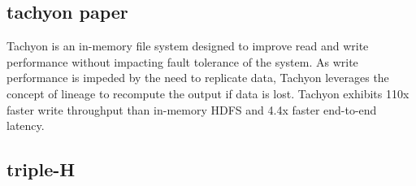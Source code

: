 \documentclass{report}
\begin{document}
	\subsection{tachyon paper}
	Tachyon is an in-memory file system designed to improve read and write performance without impacting fault tolerance of the system. As write performance is impeded by the need to replicate data, Tachyon leverages the concept of lineage to recompute the output if data is lost. Tachyon exhibits 110x faster write throughput than in-memory HDFS and 4.4x faster end-to-end latency. 
	\subsection{triple-H}
	
	
	
	
	
	
	
	
	
	
	
	
	
	
	
	
	
	
\end{document}
